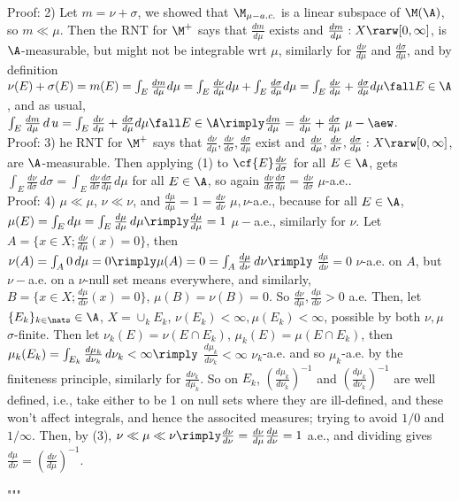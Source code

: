 \noindent
Proof: 2) Let $m = \nu + \sigma$, we showed that $\M_{\mu-a.c.}$ is a linear subspace of $\M(\A)$, so $m \ll \mu$. Then the RNT for $\M^+$ says that $\frac{dm}{d\mu}$ exists and $\frac{dm}{d\mu}: X \rarw [0,\infty]$, is $\A$-measurable, but might not be integrable wrt $\mu$, similarly for $\frac{d\nu}{d\mu}$ and $\frac{d\sigma}{d\mu}$, and by definition $\nu(E) + \sigma(E) = m(E) = \int_E \frac{dm}{d\mu} d\mu = \int_E \frac{d\nu}{d\mu} d\mu + \int_E \frac{d\sigma}{d\mu} d\mu = \int_E \frac{d\nu}{d\mu} + \frac{d\sigma}{d\mu} d\mu \fall E \in \A$, and as usual, $\int_E \frac{dm}{d\mu} \, d\,u = \int_E \frac{d\nu}{d\mu} + \frac{d\sigma}{d\mu} d\mu \fall E \in \A \rimply \frac{dm}{d\mu} = \frac{d\nu}{d\mu} + \frac{d\sigma}{d\mu} \; \mu - \aew$.  \\


\noindent
Proof: 3)  he RNT for $\M^+$ says that $\frac{d\nu}{d\mu},\frac{d\nu}{d\sigma},\frac{d\sigma}{d\mu} $ exist and $\frac{d\nu}{d\mu},\frac{d\nu}{d\sigma},\frac{d\sigma}{d\mu}: X \rarw [0,\infty]$, are $\A$-measurable. Then applying (1) to $\cf{E}\frac{d\nu}{d\sigma}$ for all $E \in \A$, gets $ \int_E \frac{d\nu}{d\sigma} \, d\sigma = \int_E \frac{d\nu}{d\sigma} \frac{d\sigma}{d\mu} \, d\mu$ for all $E \in \A$, so again $ \frac{d\nu}{d\sigma} \frac{d\sigma}{d\mu}  = \frac{d\nu}{d\sigma}$ $\mu$-a.e..\\


\noindent
Proof: 4) $\mu \ll \mu$, $\nu \ll \nu$, and $\frac{d\mu}{d\mu} = 1 = \frac{d\nu}{d\nu}$ $\mu,\nu$-a.e., because for all $E \in \A$, $\mu(E) = \int_E d\mu = \int_E \frac{d\mu}{d\mu} \, d\mu \rimply \frac{d\mu}{d\mu} = 1$ $\mu-$a.e., similarly for $\nu$.  Let $A = \{ x \in X; \frac{d\nu}{d\mu} (x) = 0 \}$, then $\nu(A) = \int_A 0 \, d\mu = 0 \rimply \mu(A) = 0 = \int_A \frac{d\mu}{d\nu} \, d\nu \rimply$ $ \frac{d\mu}{d\nu} = 0$ $\nu$-a.e. on $A$, but $\nu-$a.e. on a $\nu$-null set means everywhere, and similarly, $B = \{ x \in X; \frac{d\mu}{d\nu} (x) = 0 \}$, $\mu(B) = \nu(B) = 0$. So $\frac{d\nu}{d\mu}, \frac{d\mu}{d\nu} > 0$ a.e. Then, let $\{E_k \}_{k \in \nats} \in \A$, $X = \cup_k E_k$, $\nu(E_k) < \infty, \mu(E_k) < \infty$, possible by both $\nu, \mu$ $\sigma$-finite. Then let $\nu_k(E) = \nu(E \cap E_k)$, $\mu_k(E) = \mu(E \cap E_k)$, then $\mu_k(E_k) = \int_{E_k} \frac{d\mu_k}{d\nu_k} \, d\nu_k < \infty \rimply$ $\frac{d\mu_k}{d\nu_k} < \infty$ $\nu_k$-a.e. and so $\mu_k$-a.e. by the finiteness principle, similarly for $\frac{d\nu_k}{d\mu_k}$. So on $E_k$, $\left( \frac{d\mu_k}{d\nu_k} \right) ^{-1}$ and $\left( \frac{d\mu_k}{d\nu_k} \right) ^{-1}$ are well defined, i.e., take either to be 1 on null sets where they are ill-defined, and these won't affect integrals, and hence the associted measures; trying to avoid $1/0$ and $1/\infty$. Then, by (3), $ \nu \ll \mu \ll \nu \rimply \frac{d\nu}{d\nu}= \frac{d\nu}{d\mu}\frac{d\mu}{d\nu} = 1$ a.e., and dividing gives $\frac{d\mu}{d\nu} = \left( \frac{d\nu}{d\mu} \right)^{-1}$.













"""


